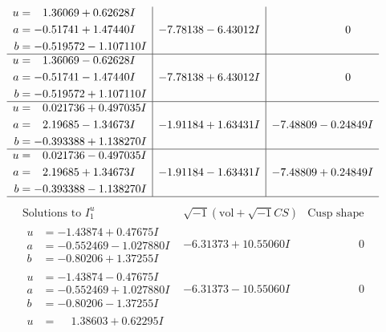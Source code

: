 \documentclass[1p]{elsarticle_modified}
\theoremstyle{definition}
\newcommand{\I}{\sqrt{-1}}
\begin{document}
$$\begin{array}{c|c|c}
\begin{aligned}
u &= \phantom{-}1.36069 + 0.62628 I \\
a &= -0.51741 + 1.47440 I \\
b &= -0.519572 - 1.107110 I\end{aligned}
 & -7.78138 - 6.43012 I & \phantom{-0.000000 } 0 \\ \hline\begin{aligned}
u &= \phantom{-}1.36069 - 0.62628 I \\
a &= -0.51741 - 1.47440 I \\
b &= -0.519572 + 1.107110 I\end{aligned}
 & -7.78138 + 6.43012 I & \phantom{-0.000000 } 0 \\ \hline\begin{aligned}
u &= \phantom{-}0.021736 + 0.497035 I \\
a &= \phantom{-}2.19685 - 1.34673 I \\
b &= -0.393388 + 1.138270 I\end{aligned}
 & -1.91184 + 1.63431 I & -7.48809 - 0.24849 I \\ \hline\begin{aligned}
u &= \phantom{-}0.021736 - 0.497035 I \\
a &= \phantom{-}2.19685 + 1.34673 I \\
b &= -0.393388 - 1.138270 I\end{aligned}
 & -1.91184 - 1.63431 I & -7.48809 + 0.24849 I\\
 \hline 
 \end{array}$$\newpage$$\begin{array}{c|c|c}  
\text{Solutions to }I^u_{1}& \I (\text{vol} + \sqrt{-1}CS) & \text{Cusp shape}\\
 \hline 
\begin{aligned}
u &= -1.43874 + 0.47675 I \\
a &= -0.552469 - 1.027880 I \\
b &= -0.80206 + 1.37255 I\end{aligned}
 & -6.31373 + 10.55060 I & \phantom{-0.000000 } 0 \\ \hline\begin{aligned}
u &= -1.43874 - 0.47675 I \\
a &= -0.552469 + 1.027880 I \\
b &= -0.80206 - 1.37255 I\end{aligned}
 & -6.31373 - 10.55060 I & \phantom{-0.000000 } 0 \\ \hline\begin{aligned}
u &= \phantom{-}1.38603 + 0.62295 I \\

\end{aligned}
\end{array}$$
\end{document}
